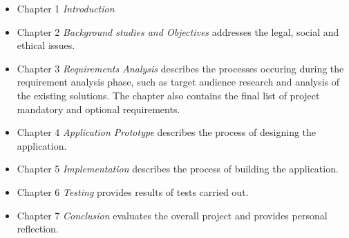 \begin{itemize}
	\item Chapter 1 \emph{Introduction}
	\item Chapter 2 \emph{Background studies and Objectives} addresses the legal, social and ethical issues.
	\item Chapter 3 \emph{Requirements Analysis} describes the processes occuring during the requirement analysis phase, such as target audience research and analysis of the existing solutions. The chapter also contains the final list of project mandatory and optional requirements.
	\item Chapter 4 \emph{Application Prototype} describes the process of designing the application.
	\item Chapter 5 \emph{Implementation} describes the process of building the application.
	\item Chapter 6 \emph{Testing} provides results of tests carried out.
	\item Chapter 7 \emph{Conclusion} evaluates the overall project and provides personal reflection.
\end{itemize}



